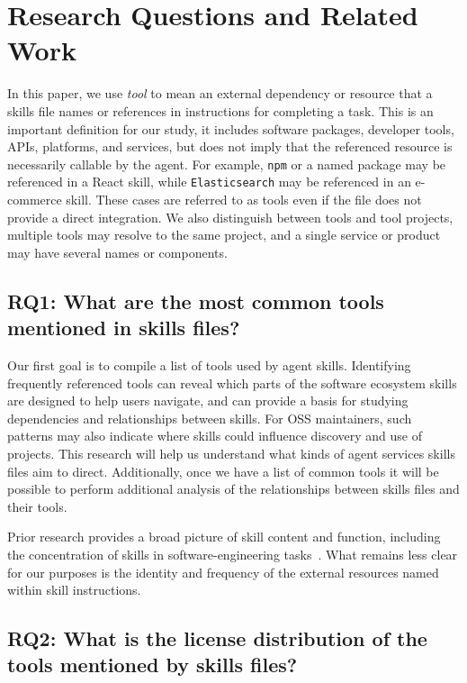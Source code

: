 \section{Research Questions and Related Work}

In this paper, we use \emph{tool} to mean an external dependency or resource that a skills file names or references in instructions for completing a task.
This is an important definition for our study, it includes software packages, developer tools, APIs, platforms, and services, but does not imply that the referenced resource is necessarily callable by the agent.
For example, \texttt{npm} or a named package may be referenced in a React skill, while \texttt{Elasticsearch} may be referenced in an e-commerce skill.
These cases are referred to as tools even if the file does not provide a direct integration.
We also distinguish between tools and tool projects, multiple tools may resolve to the same project, and a single service or product may have several names or components.

\subsection*{RQ1: What are the most common tools mentioned in skills files?}

Our first goal is to compile a list of tools used by agent skills.
Identifying frequently referenced tools can reveal which parts of the software ecosystem skills are designed to help users navigate, and can provide a basis for studying dependencies and relationships between skills.
For OSS maintainers, such patterns may also indicate where skills could influence discovery and use of projects.
This research will help us understand what kinds of agent services skills files aim to direct.
Additionally, once we have a list of common tools it will be possible to perform additional analysis of the relationships between skills files and their tools.

Prior research provides a broad picture of skill content and function, including the concentration of skills in software-engineering tasks~\cite{10.1145/3770855.3818652}.
What remains less clear for our purposes is the identity and frequency of the external resources named within skill instructions.

\subsection*{RQ2: What is the license distribution of the tools mentioned by skills files?}

